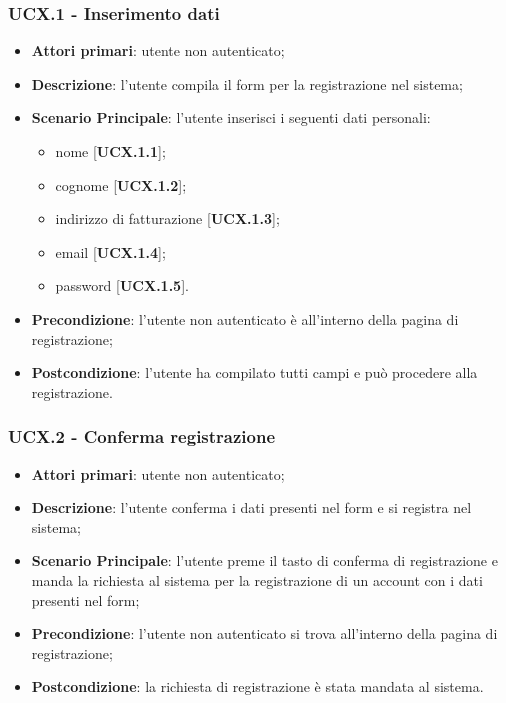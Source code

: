 \subsubsection{UCX.1 - Inserimento dati}
\begin{itemize}
\item \textbf{Attori primari}: utente non autenticato;
\item \textbf{Descrizione}: l'utente compila il form per la registrazione nel sistema;
\item \textbf{Scenario Principale}: l'utente inserisci i seguenti dati personali:
\begin{itemize}
\item nome [\textbf{UCX.1.1}];
\item cognome [\textbf{UCX.1.2}];
\item indirizzo di fatturazione [\textbf{UCX.1.3}];
\item email [\textbf{UCX.1.4}];
\item password [\textbf{UCX.1.5}].
\end{itemize}
\item \textbf{Precondizione}: l'utente non autenticato è all'interno della pagina di registrazione;
\item \textbf{Postcondizione}: l'utente ha compilato tutti campi e può procedere alla registrazione.
\end{itemize}

\subsubsection{UCX.2 - Conferma registrazione}
\begin{itemize}
\item \textbf{Attori primari}: utente non autenticato;
\item \textbf{Descrizione}: l'utente conferma i dati presenti nel form e si registra nel sistema;
\item \textbf{Scenario Principale}: l'utente preme il tasto di conferma di registrazione e manda la richiesta al sistema per la registrazione di un account con i dati presenti nel form;
\item \textbf{Precondizione}: l'utente non autenticato si trova all'interno della pagina di registrazione;
\item \textbf{Postcondizione}: la richiesta di registrazione è stata mandata al sistema.
\end{itemize}

